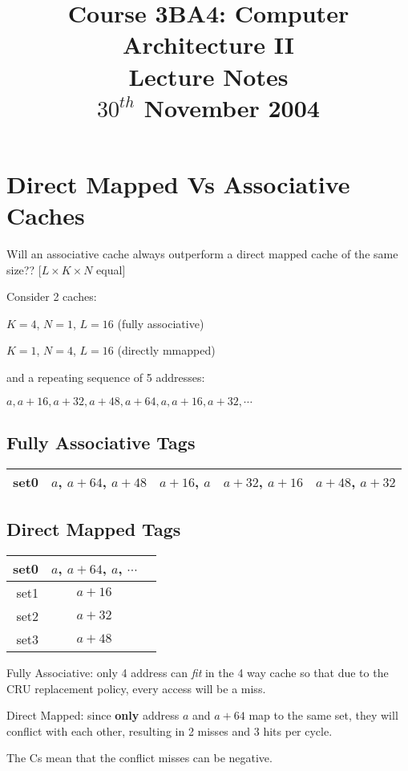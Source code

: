 \documentclass[a4paper,12pt]{article}
\begin{document}
\title{Course 3BA4: Computer Architecture II \\ Lecture Notes \\ $30^{th}$ November 2004}

\maketitle

\section*{Direct Mapped Vs Associative Caches}

Will an associative cache always outperform a direct mapped cache
of the same size?? [$L \times K \times N $ equal]

Consider 2 caches:

$K = 4$, $N = 1$, $L = 16$ (fully associative)

$K = 1$, $N = 4$, $L = 16$ (directly mmapped)

and a repeating sequence of 5 addresses:

$a, a + 16, a + 32, a + 48, a + 64, a, a + 16, a + 32, \cdots$

\subsection*{Fully Associative Tags}

\begin{tabular}{r|c|c|c|c|}
\hline
set0&\sout{$a$}, $a+64$, $a+48$&\sout{$a+16$}, $a$&\sout{$a+32$},
$a+16$&$a+48$, $a+32$\\
\hline
\end{tabular}

\subsection*{Direct Mapped Tags}

\begin{tabular}{r|c|l}
\hline
set0	&	\sout{$a$}, $a+64$, $a$, $\cdots$	&	\\	
\hline
set1	&	$a+16$									&	\\	
\hline
set2	&	$a+32$									&	\\	
\hline
set3	&	$a+48$									&	\\	
\hline
\end{tabular}

Fully Associative: only 4 address can \emph{fit} in the 4 way cache so
that due to the CRU replacement policy, every access will be a miss.

Direct Mapped: since \textbf{only} address $a$ and $a + 64$ map to the
same set, they will conflict with each other, resulting in 2 misses and
3 hits per cycle.

The Cs mean that the conflict misses can be negative.
\end{document}
